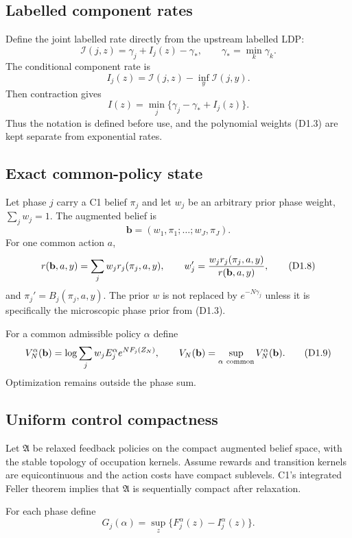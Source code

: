 \subsection{Labelled component rates}

Define the joint labelled rate directly from the upstream labelled LDP:
\[
 \mathcal I(j,z)=\gamma_j+I_j(z)-\gamma_*,
 \qquad \gamma_*=\min_k\gamma_k.                          \tag{D1.5}
\]
The conditional component rate is
\[
 I_j(z)=\mathcal I(j,z)-\inf_y\mathcal I(j,y).             \tag{D1.6}
\]
Then contraction gives
\[
 I(z)=\min_j\{\gamma_j-\gamma_*+I_j(z)\}.                  \tag{D1.7}
\]
Thus the notation is defined before use, and the polynomial weights
(D1.3) are kept separate from exponential rates.

\subsection{Exact common-policy state}

Let phase $j$ carry a C1 belief $\pi_j$ and let $w_j$ be an arbitrary prior
phase weight, $\sum_jw_j=1$.  The augmented belief is
\[
 \mathbf b=(w_1,\pi_1;\ldots;w_J,\pi_J).
\]
For one common action $a$,
\[
 r(\mathbf b,a,y)=\sum_jw_jr_j(\pi_j,a,y),\qquad
 w_j'={w_jr_j(\pi_j,a,y)\over r(\mathbf b,a,y)},           \tag{D1.8}
\]
and $\pi_j'=B_j(\pi_j,a,y)$.  The prior $w$ is not replaced by
$e^{-N\gamma_j}$ unless it is specifically the microscopic phase prior from
(D1.3).

For a common admissible policy $\alpha$ define
\[
 V_N^\alpha(\mathbf b)
 =\log\sum_jw_j
 E_j^\alpha e^{NF_j(Z_N)},\qquad
 V_N(\mathbf b)=\sup_{\alpha\ {\rm common}}V_N^\alpha(\mathbf b).       \tag{D1.9}
\]
Optimization remains outside the phase sum.

\subsection{Uniform control compactness}

Let $\mathfrak A$ be relaxed feedback policies on the compact augmented belief
space, with the stable topology of occupation kernels.  Assume rewards and
transition kernels are equicontinuous and the action costs have compact
sublevels.  C1's integrated Feller theorem implies that $\mathfrak A$ is
sequentially compact after relaxation.

For each phase define
\[
 G_j(\alpha)=\sup_z\{F_j^\alpha(z)-I_j^\alpha(z)\}.         \tag{D1.10}
\]

